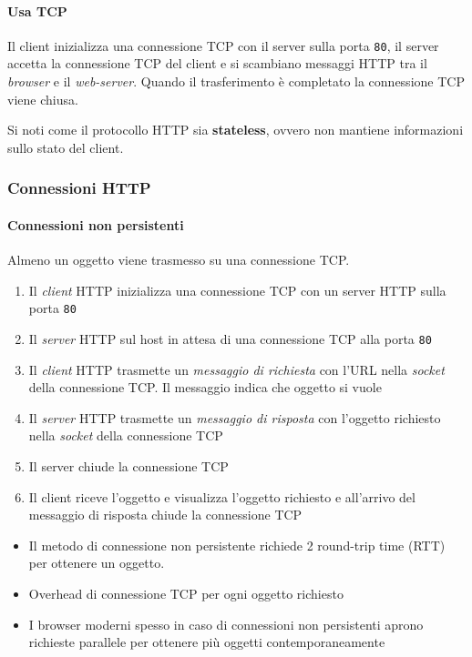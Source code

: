         \paragraph{Usa \Acrshort*{TCP}} Il client inizializza una connessione \Acrshort*{TCP} con il server sulla porta \texttt{80}, il server accetta la connessione \Acrshort*{TCP} del client e si scambiano messaggi \Acrshort*{HTTP} tra il \textit{browser} e il \textit{web-server}. Quando il trasferimento è completato la connessione \Acrshort*{TCP} viene chiusa.
        
        Si noti come il protocollo \Acrshort*{HTTP} sia \textbf{stateless}, ovvero non mantiene informazioni sullo stato del client.

        \subsubsection{Connessioni \Acrshort*{HTTP}}
            \paragraph{Connessioni non persistenti} Almeno un oggetto viene trasmesso su una connessione \Acrshort*{TCP}.
                \begin{enumerate}
                    \item Il \textit{client} \Acrshort*{HTTP} inizializza una connessione \Acrshort*{TCP} con un server \Acrshort*{HTTP} sulla porta \texttt{80}
                    \item Il \textit{server} \Acrshort*{HTTP} sul host in attesa di una connessione \Acrshort*{TCP} alla porta \texttt{80}
                    \item Il \textit{client} \Acrshort*{HTTP} trasmette un \textit{messaggio di richiesta} con l'\Acrshort*{URL} nella \textit{socket} della connessione \Acrshort*{TCP}. Il messaggio indica che oggetto si vuole
                    \item Il \textit{server} \Acrshort*{HTTP} trasmette un \textit{messaggio di risposta} con l'oggetto richiesto nella \textit{socket} della connessione \Acrshort*{TCP}
                    \item Il server chiude la connessione \Acrshort*{TCP}
                    \item Il client riceve l'oggetto e visualizza l'oggetto richiesto e all'arrivo del messaggio di risposta chiude la connessione \Acrshort*{TCP}
                \end{enumerate}
                \begin{itemize}
                    \item Il metodo di connessione non persistente richiede 2 round-trip time (\Acrshort*{RTT}) per ottenere un oggetto.
                    \item Overhead di connessione \Acrshort*{TCP} per ogni oggetto richiesto
                    \item I browser moderni spesso in caso di connessioni non persistenti aprono richieste parallele per ottenere più oggetti contemporaneamente
                \end{itemize}

